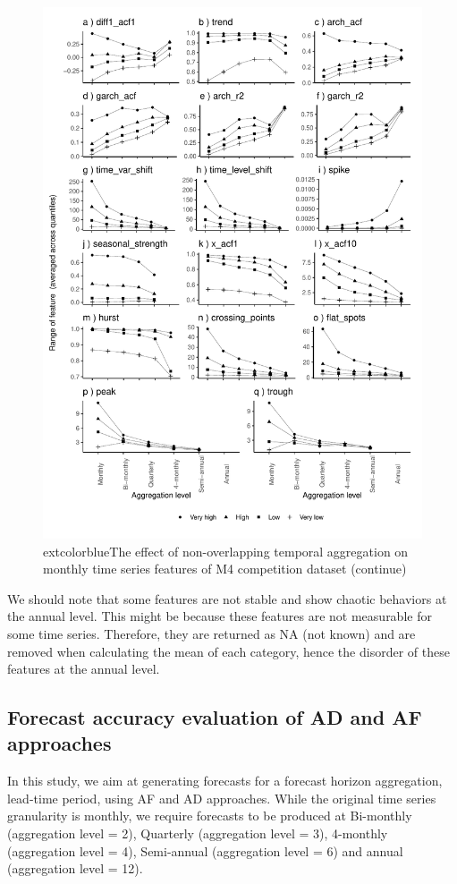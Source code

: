 \documentclass[preprint, 3p,
authoryear]{elsarticle} %
\begin{document}
\begin{figure}[H]

{\centering \includegraphics[width=0.7\linewidth]{img/300dpi/mp_category_all2} 

}

\caption{   extcolor{blue}{The effect of non-overlapping temporal aggregation on monthly time series features of M4 competition dataset (continue)} }\label{fig:featureagg2}
\end{figure}

We should note that some features are not stable and show chaotic
behaviors at the annual level. This might be because these features are
not measurable for some time series. Therefore, they are returned as NA
(not known) and are removed when calculating the mean of each category,
hence the disorder of these features at the annual level.

\hypertarget{forecast-accuracy-evaluation-of-ad-and-af-approaches}{%
\subsection{Forecast accuracy evaluation of AD and AF
approaches}\label{forecast-accuracy-evaluation-of-ad-and-af-approaches}}

In this study, we aim at generating forecasts for a forecast horizon
aggregation, lead-time period, using AF and AD approaches. While the
original time series granularity is monthly, we require forecasts to be
produced at Bi-monthly (aggregation level = 2), Quarterly (aggregation
level = 3), 4-monthly (aggregation level = 4), Semi-annual (aggregation
level = 6) and annual (aggregation level = 12).
\end{document}
